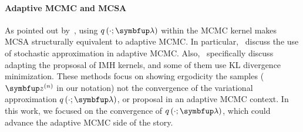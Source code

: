 \paragraph{Adaptive MCMC and MCSA}
As pointed out by~\citet{pmlr-v124-ou20a}, using \(q\left(\cdot; \vlambda\right)\) within the MCMC kernel makes MCSA structurally equivalent to adaptive MCMC.
In particular,~\citet{10.1007/s11222-008-9110-y, garthwaite_adaptive_2016, pmlr-v151-brofos22a, gabrie_adaptive_2022} discuss the use of stochastic approximation in adaptive MCMC.
Also,~\citet{andrieu_ergodicity_2006, keith_adaptive_2008, holden_adaptive_2009, giordani_adaptive_2010, pmlr-v151-brofos22a, habib2018auxiliary, neklyudov_metropolishastings_2019} specifically discuss adapting the propsosal of IMH kernels, and some of them use KL divergence minimization.
These methods focus on showing ergodicity the samples (\(\vz^{(n)}\) in our notation) not the convergence of the variational approximation \(q\left(\cdot; \vlambda\right)\), or proposal in an adaptive MCMC context.
In this work, we focused on the convergence of \(q\left(\cdot; \vlambda\right)\), which could advance the adaptive MCMC side of the story.



